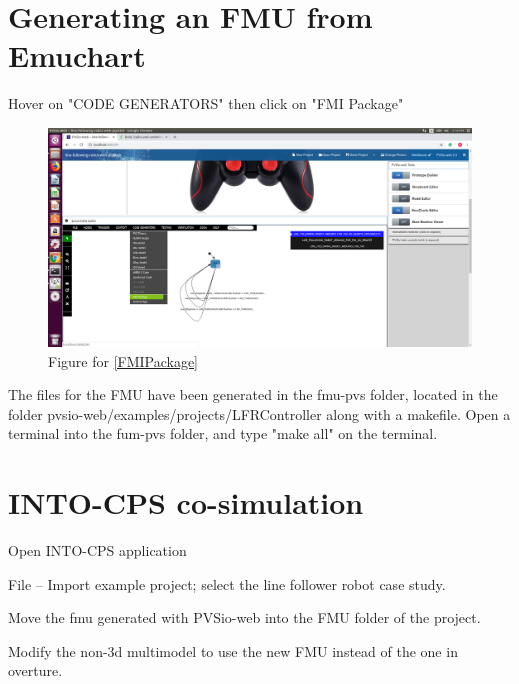 \documentclass[11pt,a4paper]{../tutorial}
\begin{document}
\section{Generating an FMU from Emuchart}
\begin{instructions}
\item \label{FMIPackage} Hover on "CODE GENERATORS" then click on "FMI Package"
\begin{figure}[h]
\includegraphics[width=1\textwidth]{figures/FMIPackage.png}
\caption{Figure for \ref{FMIPackage}}
\end{figure}
\item The files for the FMU have been generated in the fmu-pvs folder, located in the folder pvsio-web/examples/projects/LFRController along with a makefile. Open a terminal into the fum-pvs folder, and type "make all" on the terminal.

\section{INTO-CPS co-simulation}
\item Open INTO-CPS application
\item File -- Import example project; select the line follower robot case study.
\item Move the fmu generated with PVSio-web into the FMU folder of the project.
\item Modify the non-3d multimodel to use the new FMU instead of the one in overture.
\end{instructions}
\end{document}
